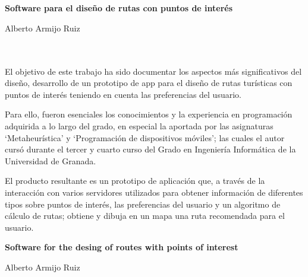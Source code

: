\chapter*{}




\cleardoublepage
\thispagestyle{empty}

\begin{center}
	{\large\bfseries Software para el diseño de rutas con 
		puntos de interés}\\
\end{center}
\begin{center}
	Alberto Armijo Ruiz\\
\end{center}
\\

\vspace{0.7cm}
\\

El objetivo de este trabajo ha sido documentar los aspectos más significativos del diseño, desarrollo de un prototipo de app para el diseño de rutas turísticas con puntos de interés teniendo en cuenta las preferencias del usuario.\newline

Para ello, fueron esenciales los conocimientos y la experiencia en programación adquirida a lo largo del grado, en especial la aportada por las asignaturas \enquote*{Metaheurística} y \enquote*{Programación de dispositivos móviles}; las cuales el autor cursó durante el tercer y cuarto curso del Grado en Ingeniería Informática de la Universidad de Granada. \newline

El producto resultante es un prototipo de aplicación que, a través de la interacción con varios servidores utilizados para obtener información de diferentes tipos sobre puntos de interés, las preferencias del usuario y un algoritmo de cálculo de rutas; obtiene y dibuja en un mapa una ruta recomendada para el usuario.

\cleardoublepage


\thispagestyle{empty}


\begin{center}
{\large\bfseries Software for the desing of routes with points of interest}\\
\end{center}
\begin{center}
Alberto Armijo Ruiz\\
\end{center}

